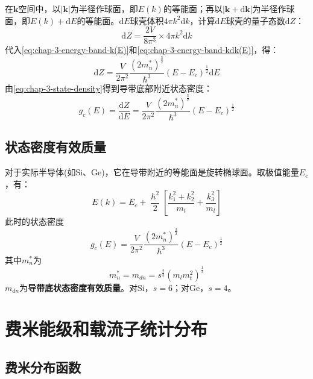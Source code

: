 在$\bm k$空间中，以$|\bm k|$为半径作球面，即$E(k)$的等能面；再以$|\bm k+\mathrm{d}\bm k|$为半径作球面，即$E(k)+\mathrm{d}E$的等能面。$\mathrm{d}E$球壳体积$4\pi k^2\mathrm{d}k$，计算$\mathrm{d}E$球壳的量子态数$\mathrm{d}Z$：
\begin{equation}
    \mathrm{d}Z=\frac{2V}{8\pi^3}\times4\pi k^2\mathrm{d}k\label{eq:chap-3-fun-dZ(dk)}
\end{equation}
代入\autoref{eq:chap-3-energy-band-k(E)}和\autoref{eq:chap-3-energy-band-kdk(E)}，得：
\begin{equation}
    \mathrm{d}Z=\frac{V}{2\pi^2}\frac{\left(2m_n^*\right)^\frac{3}{2}}{\hslash^3}\left(E-E_c\right)^\frac{1}{2}\mathrm{d}E
\end{equation}
由\autoref{eq:chap-3-state-density}得到导带底部附近状态密度：
\begin{equation}
    g_c(E)=\frac{\mathrm{d}Z}{\mathrm{d}E}=\frac{V}{2\pi^2}\frac{\left(2m_n^*\right)^\frac{3}{2}}{\hslash^3}\left(E-E_c\right)^\frac{1}{2}\label{eq:chap-3-cond-state-density-fun}
\end{equation}

\subsection{状态密度有效质量}

对于实际半导体(如Si、Ge)，它在导带附近的等能面是旋转椭球面。取极值能量$E_c$，有：
\begin{equation}
    E(k)=E_c+\frac{\hslash^2}{2}\left[\frac{k_1^2+k_2^2}{m_t}+\frac{k_3^2}{m_l}\right]
\end{equation}
此时的状态密度
\begin{equation}
    g_c(E)=\frac{V}{2\pi^2}\frac{\left(2m_n^*\right)^\frac{3}{2}}{\hslash^3}(E-E_c)^\frac{1}{2}
\end{equation}
其中$m_n^*$为
\begin{equation}
    m_n^*=m_{dn}=s^\frac{2}{3}\left(m_lm_t^2\right)^\frac{1}{3}
\end{equation}
$m_{dn}$为\textbf{导带底状态密度有效质量}。对Si，$s=6$；对Ge，$s=4$。

\section{费米能级和载流子统计分布}

\subsection{费米分布函数}

